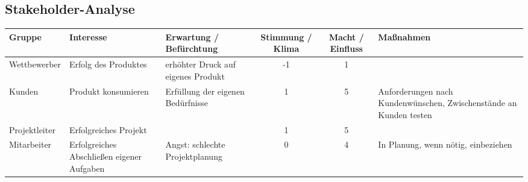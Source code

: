\begin{landscape}
\begin{center}
\section{Stakeholder-Analyse}
\begin{tabulary}{1.35\textwidth}{|L|L|L|C|C|L|}
\hline 
\textbf{Gruppe} & \textbf{Interesse} & \textbf{Erwartung / Befürchtung} & \textbf{Stimmung / Klima} & \textbf{Macht / Einfluss} & \textbf{Maßnahmen} \\ 
\hline 
Wettbewerber & Erfolg des Produktes & erhöhter Druck auf eigenes Produkt & -1 & 1 & \\ 
\hline 
Kunden & Produkt konsumieren & Erfüllung der eigenen Bedürfnisse & 1 & 5 & Anforderungen nach Kundenwünschen, Zwischenstände an Kunden testen \\ 
\hline 
Projektleiter & Erfolgreiches Projekt &  & 1 & 5 & \\ 
\hline 
Mitarbeiter & Erfolgreiches Abschließen eigener Aufgaben & Angst: schlechte Projektplanung & 0 & 4 & In Planung, wenn nötig, einbeziehen \\ 
\hline
\end{tabulary} 
 
\end{center}


\end{landscape}
\restoregeometry